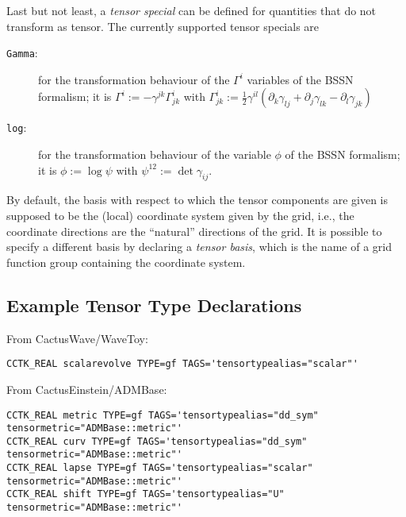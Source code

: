 Last but not least, a \emph{tensor special} can be defined for
quantities that do not transform as tensor.  The currently supported
tensor specials are
\begin{description}
\item[\texttt{Gamma}:]
   for the transformation behaviour of the $\Gamma^i$ variables of the
   BSSN formalism; it is $\Gamma^i := - \gamma^{jk} \Gamma^i_{jk}$
   with $\Gamma^i_{jk} := \frac{1}{2} \gamma^{il} \left( \partial_k
   \gamma_{lj} + \partial_j \gamma_{lk} - \partial_l \gamma_{jk}
   \right)$
\item[\texttt{log}:]
   for the transformation behaviour of the variable $\phi$ of the BSSN
   formalism; it is $\phi := \log \psi$ with $\psi^{12} := \det
   \gamma_{ij}$.
\end{description}

By default, the basis with respect to which the tensor components are
given is supposed to be the (local) coordinate system given by the
grid, i.e., the coordinate directions are the ``natural'' directions
of the grid.  It is possible to specify a different basis by declaring
a \emph{tensor basis}, which is the name of a grid function group
containing the coordinate system.

\subsection{Example Tensor Type Declarations}

From CactusWave/WaveToy:
\begin{verbatim}
CCTK_REAL scalarevolve TYPE=gf TAGS='tensortypealias="scalar"'
\end{verbatim}

From CactusEinstein/ADMBase:
\begin{verbatim}
CCTK_REAL metric TYPE=gf TAGS='tensortypealias="dd_sym" tensormetric="ADMBase::metric"'
CCTK_REAL curv TYPE=gf TAGS='tensortypealias="dd_sym" tensormetric="ADMBase::metric"'
CCTK_REAL lapse TYPE=gf TAGS='tensortypealias="scalar" tensormetric="ADMBase::metric"'
CCTK_REAL shift TYPE=gf TAGS='tensortypealias="U" tensormetric="ADMBase::metric"'
\end{verbatim}

